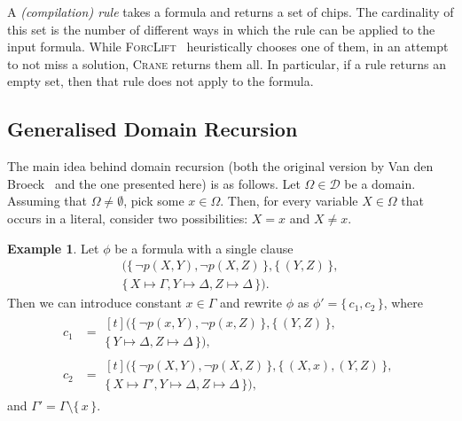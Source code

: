 \documentclass{article}
\theoremstyle{definition}
\newtheorem{example}{Example}
\begin{document}
A \emph{(compilation) rule} takes a formula and returns a set of chips. The
cardinality of this set is the number of different ways in which the rule can be
applied to the input formula. While
\textsc{ForcLift}~\cite{DBLP:conf/ijcai/BroeckTMDR11} heuristically chooses one
of them, in an attempt to not miss a solution, \textsc{Crane} returns them all.
In particular, if a rule returns an empty set, then that rule does not apply to
the formula.

\subsection{Generalised Domain Recursion}\label{sec:dr}

The main idea behind domain recursion (both the original version by Van den
Broeck~ and the one presented here) is as
follows. Let $\Omega \in \mathcal{D}$ be a domain. Assuming that
$\Omega \ne \emptyset$, pick some $x \in \Omega$. Then, for every variable
$X \in \Omega$ that occurs in a literal, consider two possibilities: $X = x$ and
$X \ne x$.

\begin{example}\label{example:dr}
  Let $\phi$ be a formula with a single clause
  \begin{multline*}
    (\{\, \neg p(X, Y), \neg p(X, Z) \,\}, \{\, (Y, Z) \,\}, \\
    \{\, X \mapsto \Gamma, Y \mapsto \Delta, Z \mapsto \Delta \,\}).
  \end{multline*}
  Then we can introduce constant $x \in \Gamma$ and rewrite $\phi$ as
  $\phi' = \{\, c_{1}, c_{2} \,\}$, where
  \begin{align*}
    c_{1} &= \begin{multlined}[t]
      (\{\, \neg p(x, Y), \neg p(x, Z) \,\}, \{\, (Y, Z) \,\}, \\
      \{\, Y \mapsto \Delta, Z \mapsto \Delta \,\}),
      \end{multlined}\\
    c_{2} &= \begin{multlined}[t]
      (\{\, \neg p(X, Y), \neg p(X, Z) \,\}, \{\, (X, x), (Y, Z) \,\}, \\
      \{\, X \mapsto \Gamma', Y \mapsto \Delta, Z \mapsto \Delta \,\}),
      \end{multlined}
  \end{align*}
  and $\Gamma' = \Gamma \setminus \{\, x \,\}$.
\end{example}
\end{document}
